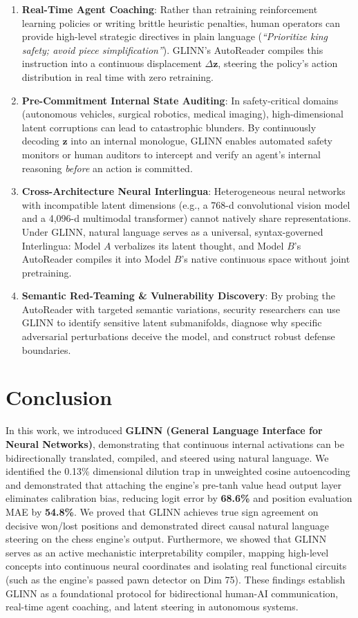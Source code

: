 \documentclass[10pt,twocolumn]{article}
\begin{document}
\begin{enumerate}
    \item \textbf{Real-Time Agent Coaching}: Rather than retraining reinforcement learning policies or writing brittle heuristic penalties, human operators can provide high-level strategic directives in plain language (\textit{``Prioritize king safety; avoid piece simplification''}). GLINN's AutoReader compiles this instruction into a continuous displacement $\Delta \mathbf{z}$, steering the policy's action distribution in real time with zero retraining.
    \item \textbf{Pre-Commitment Internal State Auditing}: In safety-critical domains (autonomous vehicles, surgical robotics, medical imaging), high-dimensional latent corruptions can lead to catastrophic blunders. By continuously decoding $\mathbf{z}$ into an internal monologue, GLINN enables automated safety monitors or human auditors to intercept and verify an agent's internal reasoning \textit{before} an action is committed.
    \item \textbf{Cross-Architecture Neural Interlingua}: Heterogeneous neural networks with incompatible latent dimensions (e.g., a 768-d convolutional vision model and a 4,096-d multimodal transformer) cannot natively share representations. Under GLINN, natural language serves as a universal, syntax-governed Interlingua: Model $A$ verbalizes its latent thought, and Model $B$'s AutoReader compiles it into Model $B$'s native continuous space without joint pretraining.
    \item \textbf{Semantic Red-Teaming \& Vulnerability Discovery}: By probing the AutoReader with targeted semantic variations, security researchers can use GLINN to identify sensitive latent submanifolds, diagnose why specific adversarial perturbations deceive the model, and construct robust defense boundaries.
\end{enumerate}

\section{Conclusion}
In this work, we introduced \textbf{GLINN (General Language Interface for Neural Networks)}, demonstrating that continuous internal activations can be bidirectionally translated, compiled, and steered using natural language. We identified the 0.13\% dimensional dilution trap in unweighted cosine autoencoding and demonstrated that attaching the engine's pre-tanh value head output layer eliminates calibration bias, reducing logit error by \textbf{68.6\%} and position evaluation MAE by \textbf{54.8\%}. We proved that GLINN achieves true sign agreement on decisive won/lost positions and demonstrated direct causal natural language steering on the chess engine's output. Furthermore, we showed that GLINN serves as an active mechanistic interpretability compiler, mapping high-level concepts into continuous neural coordinates and isolating real functional circuits (such as the engine's passed pawn detector on Dim 75). These findings establish GLINN as a foundational protocol for bidirectional human-AI communication, real-time agent coaching, and latent steering in autonomous systems.



\end{document}
